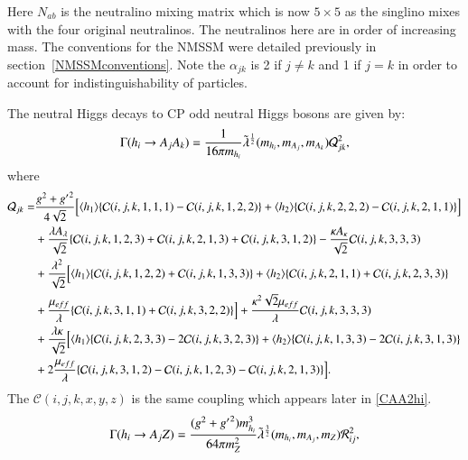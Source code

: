 \documentclass[final,3p,times,pdflatex]{elsarticle}
\begin{document}
Here $N_{ab}$ is the neutralino mixing matrix which is now $5\times5$ as the singlino mixes with the four original neutralinos. The neutralinos here are in order of increasing mass. The conventions for the NMSSM were detailed previously in section~\ref{NMSSMconventions}. Note the $\alpha_{jk}$ is 2 if $j\neq k$ and 1 if $j=k$ in order to account for indistinguishability of particles.

The neutral Higgs decays to CP odd neutral Higgs bosons are given by:
\begin{equation} \label{hAANMSSM}
\Gamma(h_{i} \rightarrow A_{j} A_{k}) = {1 \over 16 \pi m_{h_i}} \tilde{\lambda}^{1 \over 2}(m_{h_i},m_{A_j},m_{A_k}) \mathcal{Q}_{jk}^2,
\end{equation}
where 
\begin{equation}
\begin{aligned}
\mathcal{Q}_{jk} = & {g^2 + {g'}^2 \over 4\sqrt{2}}\Big[\langle h_{1} \rangle \{ \mathcal{C}(i,j,k,1,1,1) - \mathcal{C}(i,j,k,1,2,2) \} + \langle h_{2} \rangle \{ \mathcal{C}(i,j,k,2,2,2) - \mathcal{C} (i,j,k,2,1,1)\}\Big] \\ & + {\lambda A_{\lambda} \over \sqrt{2}}\{ \mathcal{C}(i,j,k,1,2,3) +\mathcal{C}(i,j,k,2,1,3) + \mathcal{C}(i,j,k,3,1,2)\} - {\kappa A_{\kappa} \over \sqrt{2}}\mathcal{C}(i,j,k,3,3,3) \\ & + {\lambda^2 \over \sqrt{2}}\Big[\langle h_{1} \rangle \{\mathcal{C}(i,j,k,1,2,2) + \mathcal{C}(i,j,k,1,3,3)\} + \langle h_{2} \rangle \{ \mathcal{C}(i,j,k,2,1,1) + \mathcal{C}(i,j,k,2,3,3)\} \\ & + {\mu_{eff} \over \lambda}\{\mathcal{C}(i,j,k,3,1,1) + \mathcal{C}(i,j,k,3,2,2)\}\Big] + {\kappa^2 \sqrt{2} \mu_{eff} \over \lambda} \mathcal{C}(i,j,k,3,3,3) \\ & + {\lambda \kappa \over \sqrt{2}}\Big[\langle h_{1} \rangle \{\mathcal{C}(i,j,k,2,3,3) - 2\mathcal{C}(i,j,k,3,2,3)\} + \langle h_{2} \rangle \{\mathcal{C}(i,j,k,1,3,3) - 2\mathcal{C}(i,j,k,3,1,3)\} \\ & + 2 {\mu_{eff} \over \lambda}\{\mathcal{C}(i,j,k,3,1,2) - \mathcal{C}(i,j,k,1,2,3) - \mathcal{C}(i,j,k,2,1,3)\}\Big].
\end{aligned}
\end{equation}
The $\mathcal{C}(i,j,k,x,y,z)$ is the same coupling which appears later in \eqref{CAA2hi}.
\begin{equation} \label{hAZNMSSM}
\Gamma(h_i \rightarrow A_j Z) = {(g^2 + {g'}^2) m_{h_i}^3 \over 64\pi m_{Z}^2}\tilde{\lambda}^{3 \over 2}(m_{h_i},m_{A_j},m_Z) \mathcal{R}_{ij}^2,
\end{equation}
\end{document}
